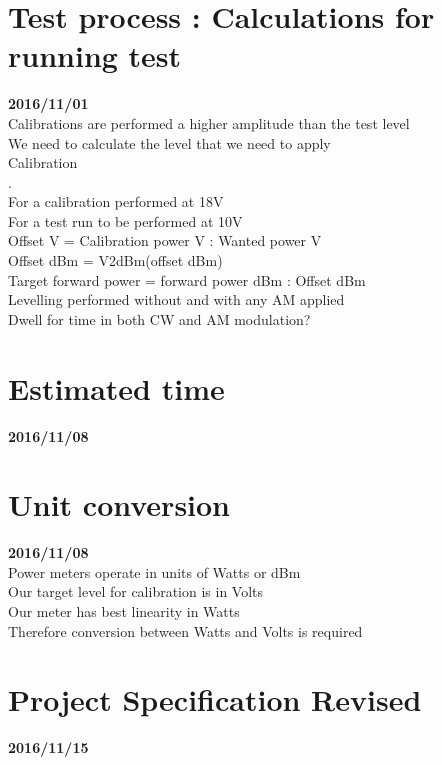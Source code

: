 \section{Test process : Calculations for running test}\textbf{2016/11/01}\\
Calibrations are performed a higher amplitude than the test level\\
We need to calculate the level that we need to apply\\
Calibration\\


.\\
For a calibration performed at 18V\\
For a test run to be performed at 10V\\
Offset V = Calibration power V : Wanted power V\\
Offset dBm = V2dBm(offset dBm)\\
Target forward power = forward power dBm : Offset dBm\\

Levelling performed without and with any AM applied\\
Dwell for time in both CW and AM modulation?\\

\section{Estimated time}\textbf{2016/11/08}\\

\section{Unit conversion}\textbf{2016/11/08}\\
Power meters operate in units of Watts or dBm\\
Our target level for calibration is in Volts\\
Our meter has best linearity in Watts\\
Therefore conversion between Watts and Volts is required\\


\section{Project Specification Revised}\textbf{2016/11/15}\\

